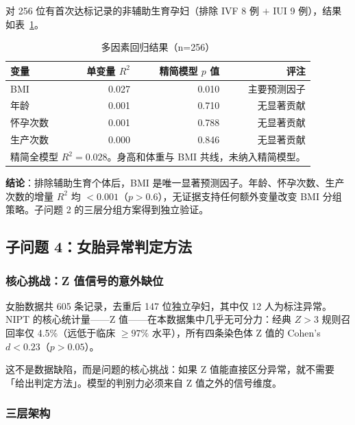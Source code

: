 \documentclass{mcm-paper}
\begin{document}
对 256 位有首次达标记录的非辅助生育孕妇（排除 IVF 8 例 $+$ IUI 9 例），结果如表~\ref{tab:multi}。

\begin{table}[H]
\centering
\caption{多因素回归结果（n=256）}
\label{tab:multi}
\begin{tabular}{lrrr}
\toprule
变量 & 单变量 $R^2$ & 精简模型 $p$ 值 & 评注 \\
\midrule
BMI   & 0.027 & 0.010 & 主要预测因子 \\
年龄   & 0.001 & 0.710 & 无显著贡献 \\
怀孕次数 & 0.001 & 0.788 & 无显著贡献 \\
生产次数 & 0.000 & 0.846 & 无显著贡献 \\
\bottomrule
\multicolumn{4}{l}{\footnotesize 精简全模型 $R^2=0.028$。身高和体重与 BMI 共线，未纳入精简模型。} \\
\end{tabular}
\end{table}

\textbf{结论}：排除辅助生育个体后，BMI 是唯一显著预测因子。年龄、怀孕次数、生产次数的增量 $R^2$ 均 $<0.001$（$p>0.6$），无证据支持任何额外变量改变 BMI 分组策略。子问题 2 的三层分组方案得到独立验证。

\subsection{子问题 4：女胎异常判定方法}

\subsubsection{核心挑战：Z 值信号的意外缺位}

女胎数据共 605 条记录，去重后 147 位独立孕妇，其中仅 12 人为标注异常。NIPT 的核心统计量——Z 值——在本数据集中几乎无可分力：经典 $Z>3$ 规则召回率仅 4.5\%（远低于临床 $\geq 97\%$ 水平），所有四条染色体 Z 值的 Cohen's $d<0.23$（$p>0.05$）。

这不是数据缺陷，而是问题的核心挑战：如果 Z 值能直接区分异常，就不需要「给出判定方法」。模型的判别力必须来自 Z 值之外的信号维度。

\subsubsection{三层架构}
\end{document}
